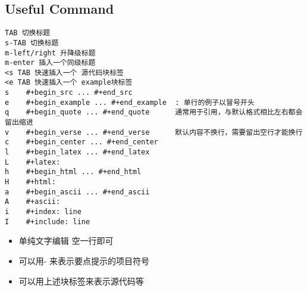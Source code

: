 \documentclass[11pt]{article}
\begin{document}
\subsection{Useful Command}
\label{sec:org1a8ba1a}
\begin{verbatim}
TAB 切换标题
s-TAB 切换标题
m-left/right 升降级标题
m-enter 插入一个同级标题
<s TAB 快速插入一个 源代码块标签
<e TAB 快速插入一个 example块标签
s    #+begin_src ... #+end_src   
e    #+begin_example ... #+end_example  : 单行的例子以冒号开头  
q    #+begin_quote ... #+end_quote      通常用于引用，与默认格式相比左右都会留出缩进  
v    #+begin_verse ... #+end_verse      默认内容不换行，需要留出空行才能换行  
c    #+begin_center ... #+end_center   
l    #+begin_latex ... #+end_latex   
L    #+latex:   
h    #+begin_html ... #+end_html   
H    #+html:   
a    #+begin_ascii ... #+end_ascii   
A    #+ascii:   
i    #+index: line   
I    #+include: line 
\end{verbatim}
\begin{itemize}
\item 单纯文字编辑 空一行即可
\item 可以用- 来表示要点提示的项目符号
\item 可以用上述块标签来表示源代码等
\end{itemize}
\end{document}
